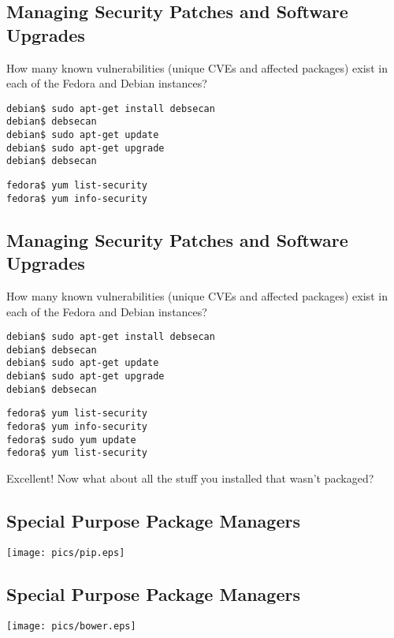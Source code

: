 \documentclass[xga]{xdvislides}
\begin{document}
\subsection{Managing Security Patches and Software Upgrades}
How many known vulnerabilities (unique CVEs and affected packages) exist
in each of the Fedora and Debian instances?

\begin{verbatim}
debian$ sudo apt-get install debsecan
debian$ debsecan
debian$ sudo apt-get update
debian$ sudo apt-get upgrade
debian$ debsecan
\end{verbatim}

\begin{verbatim}
fedora$ yum list-security
fedora$ yum info-security
\end{verbatim}

\subsection{Managing Security Patches and Software Upgrades}
How many known vulnerabilities (unique CVEs and affected packages) exist
in each of the Fedora and Debian instances?

\begin{verbatim}
debian$ sudo apt-get install debsecan
debian$ debsecan
debian$ sudo apt-get update
debian$ sudo apt-get upgrade
debian$ debsecan
\end{verbatim}

\begin{verbatim}
fedora$ yum list-security
fedora$ yum info-security
fedora$ sudo yum update
fedora$ yum list-security
\end{verbatim}

\vspace{.5in}
Excellent! Now what about all the stuff you installed that
wasn't packaged?

\subsection{Special Purpose Package Managers}
\vfill
\begin{center}
	\texttt{[image: pics/pip.eps]}
\end{center}
\vfill

\subsection{Special Purpose Package Managers}
\vfill
\begin{center}
	\texttt{[image: pics/bower.eps]}
\end{center}
\vfill
\end{document}
